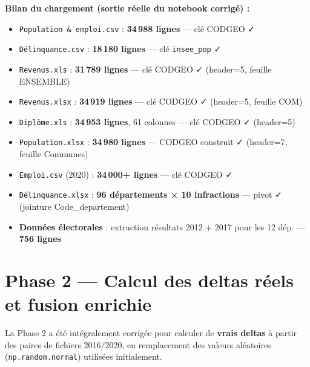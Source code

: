\documentclass[12pt,a4paper,oneside]{report}
\newcommand{\code}[1]{\texttt{\small #1}}
\begin{document}
\textbf{Bilan du chargement (sortie réelle du notebook corrigé) :}
\begin{itemize}
  \item \texttt{Population \& emploi.csv} : \textbf{34\,988 lignes} — clé CODGEO ✓
  \item \texttt{Délinquance.csv} : \textbf{18\,180 lignes} — clé \code{insee\_pop} ✓
  \item \texttt{Revenus.xls} : \textbf{31\,789 lignes} — clé CODGEO ✓ (header=5, feuille ENSEMBLE)
  \item \texttt{Revenus.xlsx} : \textbf{34\,919 lignes} — clé CODGEO ✓ (header=5, feuille COM)
  \item \texttt{Diplôme.xls} : \textbf{34\,953 lignes}, 61 colonnes — clé CODGEO ✓ (header=5)
  \item \texttt{Population.xlsx} : \textbf{34\,980 lignes} — CODGEO construit ✓ (header=7, feuille Communes)
  \item \texttt{Emploi.csv} (2020) : \textbf{34\,000+ lignes} — clé CODGEO ✓
  \item \texttt{Délinquance.xlsx} : \textbf{96 départements × 10 infractions} — pivot ✓ (jointure Code\_departement)
  \item \textbf{Données électorales} : extraction résultats 2012 + 2017 pour les 12 dép. — \textbf{756 lignes}
\end{itemize}

\section{Phase 2 — Calcul des deltas réels et fusion enrichie}

La Phase 2 a été intégralement corrigée pour calculer de \textbf{vrais deltas} à partir des paires de fichiers 2016/2020, en remplacement des valeurs aléatoires (\code{np.random.normal}) utilisées initialement.
\end{document}
